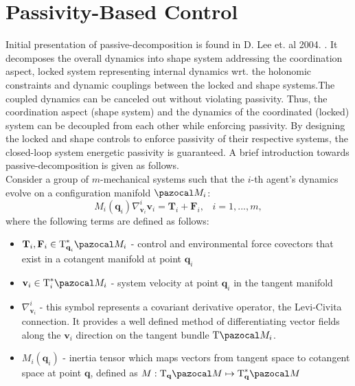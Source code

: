 \section{Passivity-Based Control} \label{section:pssivity}
Initial presentation of passive-decomposition is found in D. Lee et. al 2004. \cite{passive-decomp-mechanical-coord-req}. It decomposes the overall dynamics into shape system addressing the coordination aspect, locked system representing internal dynamics wrt. the holonomic constraints and dynamic couplings between the locked and shape systems.The coupled dynamics can be canceled out without violating passivity. Thus, the coordination aspect (shape system) and the dynamics of the coordinated (locked) system can be decoupled from each other while enforcing passivity. By designing the locked and shape controls to enforce passivity  of their respective systems, the closed-loop system energetic passivity is guaranteed. A brief introduction towards passive-decomposition is given as follows. \\
Consider a group of $m$-mechanical systems such that the $i$-th agent's dynamics evolve on a configuration manifold $\Ma_i$:
	\begin{equation}
	M_i(\textbf{q}_i)\nabla^i_{\textbf{v}_i} \textbf{v}_i = \textbf{T}_i + \textbf{F}_i, \;\;\; i = 1,...,m,
\end{equation}
where the following terms are defined as follows:
\begin{itemize}
	\item $\textbf{T}_i, \textbf{F}_i\in\text{T}_{\textbf{q}_i}^*\Ma_i$ - control and environmental force covectors that exist in a cotangent manifold at point $\textbf{q}_i$
	
	\item $\textbf{v}_i \in \text{T}_i^{*}\Ma_i$ - system velocity at point $\textbf{q}_i$ in the tangent manifold
	
	\item $\nabla^i_{\textbf{v}_i}$ - this symbol represents a covariant derivative operator, the Levi-Civita connection. It provides a well defined method of differentiating vector fields along the ${\textbf{v}_i}$ direction on the tangent bundle $\text{T}\Ma_i$.
	
	\item $M_i(\textbf{q}_i)$ - inertia tensor which maps vectors from tangent space to cotangent space at point $\textbf{q}$, defined as $M:\text{T}_{\textbf{q}}\Ma \mapsto \text{T}_{\textbf{q}}^*\Ma$
\end{itemize}

